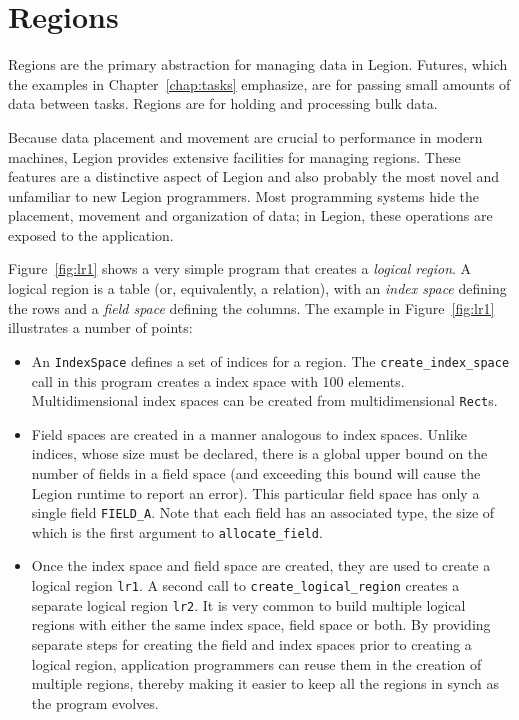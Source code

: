 \chapter{Regions}
\label{chap:regions}

Regions are the primary abstraction for managing data in Legion.  Futures,
which the examples in Chapter~\ref{chap:tasks} emphasize, are for passing small amounts of data
between tasks. Regions are for holding and processing bulk data.

Because data placement and movement are crucial to performance in modern machines,
Legion provides extensive facilities for managing regions.  These features are a
distinctive aspect of Legion and also probably the most novel and unfamiliar 
to new Legion programmers.  Most programming systems hide the placement,
movement and organization of data; in Legion, these operations are exposed to
the application.

Figure~\ref{fig:lr1} shows a very simple program that
creates a {\em logical region}.  A logical region is a table (or,
equivalently, a relation), with an {\em index space} defining the rows
and a {\em field space} defining the columns. The example
in Figure~\ref{fig:lr1} illustrates a number of points:

\begin{itemize}

\item An {\tt IndexSpace} defines a set of indices for a region.  The {\tt create\_index\_space}
call in this program creates a index space with 100 elements.  Multidimensional index spaces can be
created from multidimensional {\tt Rect}s.

\item Field spaces are created in a manner analogous to index spaces.
  Unlike indices, whose size must be declared, there is a global upper
  bound on the number of fields in a field space (and exceeding this bound will cause
  the Legion runtime to report an error).  This particular
  field space has only a single field {\tt FIELD\_A}.  Note that each field has an associated type, the
  size of which is the first argument to {\tt allocate\_field}.

\item Once the index space and field space are created, they are used to create
a logical region {\tt lr1}.  A second call to {\tt create\_logical\_region}
creates a separate logical region {\tt lr2}.  It is very common to build
multiple logical regions with either the same index space, field space or both.
By providing separate steps for creating the field and index spaces prior to creating
a logical region, application programmers can reuse them in the creation of multiple
regions, thereby making it easier to keep all the regions in synch as the program 
evolves.
\end{itemize}

